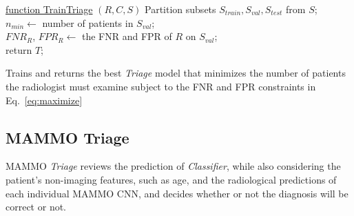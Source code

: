 \documentclass[journal]{IEEEtran}
\begin{document}
\begin{algorithm}[t]

    \underline{function TrainTriage} $(R,C,S)$\;
    Partition subsets $S_{train}, S_{val}, S_{test}$ from $S$;\\
    $n_{min} \leftarrow $ number of patients in $S_{val}$;\\
    $FNR_{R}$, $FPR_{R} \leftarrow$ the FNR and FPR of $R$ on $S_{val}$; \\
    return $T$;
    \caption{\label{alg0} Trains and returns the best \textit{Triage} model that minimizes the number of patients the radiologist must examine subject to the FNR and FPR constraints in Eq.~\ref{eq:maximize}}
\end{algorithm}

\subsection{MAMMO Triage} 

MAMMO \textit{Triage} reviews the prediction of \textit{Classifier}, while also considering the patient's non-imaging features, such as age, and the radiological predictions of each individual MAMMO CNN, and decides whether or not the diagnosis will be correct or not. 
\end{document}
